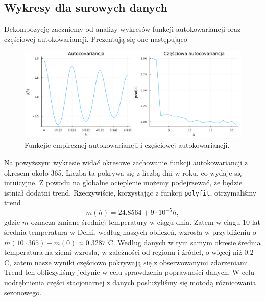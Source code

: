 \documentclass[12pt]{article}
\begin{document}
	\subsection{Wykresy dla surowych danych}
	Dekompozycję zaczniemy od analizy wykresów funkcji autokowariancji oraz częściowej autokowariancji. Prezentują się one następująco
	\begin{figure}[H]
		\includegraphics[width=\columnwidth]{Budnik/img/auto_dry.png}
		\caption{Funkcjie empircznej autokowariancji i częściowej autokowariancji.}\label{fig:dry_cov}
	\end{figure}
	Na powyższym wykresie widać okresowe zachowanie funkcji autokowariancji z okresem około 365. Liczba ta pokrywa się z liczbą dni w roku, co wydaje się intuicyjne. Z powodu na globalne ocieplenie możemy podejrzewać, że będzie istniał dodatni trend. Rzeczywiście, korzystając z funkcji \verb*|polyfit|, otrzymaliśmy trend
	\begin{equation}
		m(h)=24.8564+9\cdot10^{-5}h,
	\end{equation}  
	gdzie $m$ oznacza zmianę średniej temperatury w ciągu dnia. Zatem w ciągu 10 lat średnia temperatura w Delhi, według naszych obliczeń, wzrosła w przybliżeniu o $m(10\cdot365)-m(0)\approx0.3287^\circ$C. Według danych w tym samym okresie średnia temperatura na ziemi wzrosła, w zależności od regionu i źródeł, o więcej niż $0.2^\circ$C, zatem nasze wyniki częściowo pokrywają się z obserwowanymi zdarzeniami. Trend ten obliczyliśmy jedynie w celu sprawdzenia poprawności danych. W celu uodrębnienia części stacjonarnej z danych posłużyliśmy się motodą różnicowania sezonowego.
\end{document}

